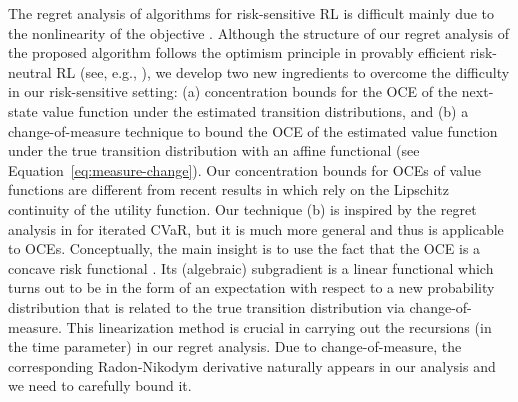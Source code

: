 \documentclass[11pt]{article}
\newcommand{\1}{\mathbbm{1}}
\newcommand{\gao}[1]{\textcolor{blue}{{#1}}} %
\begin{document}
The regret analysis of algorithms for risk-sensitive RL is difficult mainly due to the nonlinearity of the objective \citep{fei2020risk}.  Although the structure of our regret analysis of the proposed algorithm follows the optimism principle in provably efficient risk-neutral RL (see, e.g., \cite{azar2017minimax, agarwal2019reinforcement}),  
we develop two new ingredients to overcome the difficulty in our risk-sensitive setting: (a) concentration bounds for the OCE of the next-state value function under the estimated transition distributions, and (b) a change-of-measure technique to bound the OCE of the estimated value function under the true transition distribution with an affine functional (see Equation~\eqref{eq:measure-change}).  Our concentration bounds for OCEs of value functions are different from recent results in \cite{la2022wasserstein} which rely on the Lipschitz continuity of the utility function. Our technique (b) is inspired by the regret analysis in \citep{du2022risk} for iterated CVaR, but it is much more general and thus is applicable to OCEs. Conceptually, the main insight is to use the fact that the OCE is a concave risk functional \citep[Theorem 2.1]{ben2007old}. Its (algebraic) subgradient is a linear functional \cite{ruszczynski2006optimization} which turns out to be in the form of an expectation with respect to a new probability distribution that is related to the true transition distribution via change-of-measure. 
This linearization method is crucial in carrying out the recursions (in the time parameter) in our regret analysis. Due to change-of-measure, the corresponding Radon-Nikodym derivative naturally appears in our analysis and we need to carefully bound it. 



\end{document}
